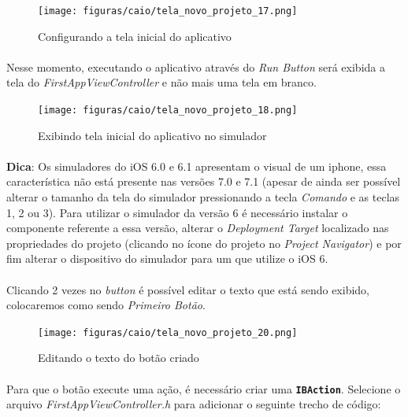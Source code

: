\documentclass[a4paper,12pt,brazil,doubleside]{book}
\begin{document}
\begin{singlespace}
\begin{figure}[H]
  \centering
  \texttt{[image: figuras/caio/tela\_novo\_projeto\_17.png]}
  \caption{Configurando a tela inicial do aplicativo}
  \label{fig:a}
\end{figure}

\paragraph{}Nesse momento, executando o aplicativo através do \emph{Run Button} será exibida a tela do \emph{FirstAppViewController} e não mais uma tela em branco.

\begin{figure}[H]
  \centering
  \texttt{[image: figuras/caio/tela\_novo\_projeto\_18.png]}
  \caption{Exibindo tela inicial do aplicativo no simulador}
  \label{fig:a}
\end{figure}

\begin{framed}
\paragraph{}\textbf{Dica}: Os simuladores do iOS 6.0 e 6.1 apresentam o visual de um iphone, essa característica não está presente nas versões 7.0 e 7.1 (apesar de ainda ser possível alterar o tamanho da tela do simulador pressionando a tecla \textit{Comando} e as teclas 1, 2 ou 3). Para utilizar o simulador da versão 6 é necessário instalar o componente referente a essa versão, alterar o \textit{Deployment Target} localizado nas propriedades do projeto (clicando no ícone do projeto no \textit{Project Navigator}) e por fim alterar o dispositivo do simulador para um que utilize o iOS 6.\end{framed}

\paragraph{}Clicando 2 vezes no \emph{button} é possível editar o texto que está sendo exibido, colocaremos como sendo \emph{Primeiro Botão}.

\begin{figure}[H]
  \centering
  \texttt{[image: figuras/caio/tela\_novo\_projeto\_20.png]}
  \caption{Editando o texto do botão criado}
  \label{fig:a}
\end{figure}

\bigskip

\paragraph{}Para que o botão execute uma ação, é necessário criar uma \texttt{\textbf{IBAction}}. Selecione o arquivo \emph{FirstAppViewController.h} para adicionar o seguinte trecho de código:


\end{singlespace}
\end{document}
